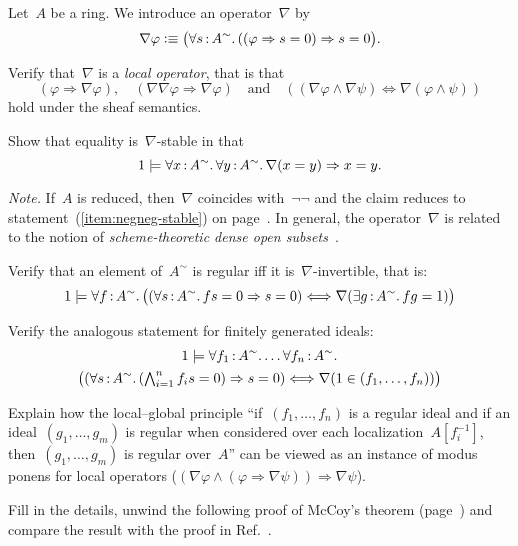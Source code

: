 \documentclass{ws-rv9x6}
\begin{document}
{\begin{exercise}%
\label{ex:local-global}%
Let~$A$ be a ring. We introduce an operator~$\nabla$ by
\[ \nabla\varphi \vcentcolon\equiv \bigl(\forall s\,{:}\,A^\sim\mathpunct{.} ((\varphi \Rightarrow s = 0)
\Rightarrow s = 0\bigr).\]
\begin{alphlist}[(f)]
\item Verify that~$\nabla$ is a \emph{local operator}, that is that
\[ (\varphi \Rightarrow \nabla\varphi), \quad
(\nabla\nabla\varphi \Rightarrow \nabla\varphi) \quad\text{and}\quad
((\nabla\varphi \wedge \nabla\psi) \Leftrightarrow \nabla(\varphi \wedge \psi))
\]
hold under the sheaf semantics.
\item Show that equality is~$\nabla$-stable in that
\[ 1 \models \forall x\,{:}\,A^\sim\mathpunct{.} \forall y\,{:}\,A^\sim\mathpunct{.} \nabla(x = y) \Rightarrow x = y. \]

{\scriptsize\emph{Note.} If~$A$ is reduced, then~$\nabla$ coincides
with~$\neg\neg$ and the claim reduces to statement~(\ref{item:negneg-stable})
on page~\pageref{item:negneg-stable}. In general, the operator~$\nabla$ is
related to the notion of \emph{scheme-theoretic dense open
subsets}~\cite[Lemma~9.11]{blechschmidt:phd}.\par}
\item Verify that an element of~$A^\sim$ is regular iff it
is~$\nabla$-invertible, that is:
\[ 1 \models \forall f\,{:}\,A^\sim\mathpunct{.}
  \bigl(
    (\forall s\,{:}\,A^\sim\mathpunct{.} fs = 0 \Rightarrow s = 0) \Longleftrightarrow
    \nabla(\exists g\,{:}\,A^\sim\mathpunct{.} fg = 1)
  \bigr)
\]
\item Verify the analogous statement for finitely generated ideals:
\begin{multline*}1 \models \forall f_1\,{:}\,A^\sim\mathpunct{.} \ldots \forall f_n\,{:}\,A^\sim\mathpunct{.} \\
  \bigl(
    (\forall s\,{:}\,A^\sim\mathpunct{.} (\textstyle\bigwedge_{i=1}^n f_is = 0) \Rightarrow s = 0) \Longleftrightarrow
    \nabla(1 \in (f_1,\ldots,f_n))
  \bigr) \end{multline*}
\item Explain how the local--global principle ``if~$(f_1,\ldots,f_n)$ is a
regular ideal and if an ideal~$(g_1,\ldots,g_m)$ is regular when considered
over each localization~$A[f_i^{-1}]$, then~$(g_1,\ldots,g_m)$ is regular
over~$A$'' can be viewed as an instance of modus ponens for local operators
($(\nabla\varphi \wedge (\varphi \Rightarrow \nabla\psi)) \Longrightarrow
\nabla\psi$).
\item Fill in the details, unwind the following proof of McCoy's theorem
(page~\pageref{par:mccoy}) and compare the result with the proof in
Ref.~\cite[Theorem~2.4]{coquand-quitte:constructive-finite-free-resolutions}.


\end{alphlist}
\end{exercise}}
\end{document}
